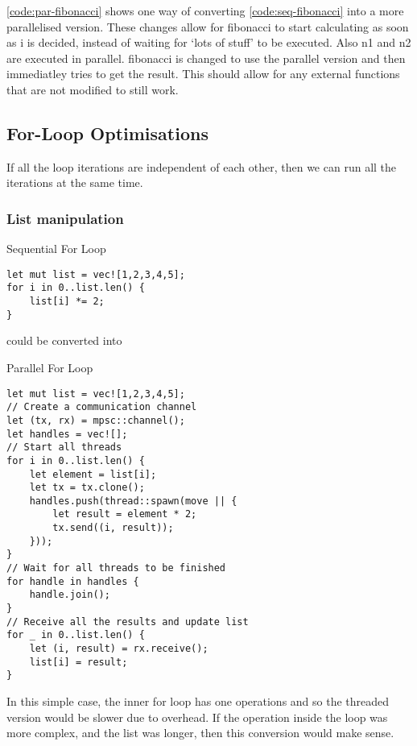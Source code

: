 \documentclass[conference]{IEEEtran}
\begin{document}
\autoref{code:par-fibonacci} shows one way of converting \autoref{code:seq-fibonacci} into a more parallelised version. These changes allow for fibonacci to start calculating as soon as i is decided, instead of waiting for `lots of stuff' to be executed. Also n1 and n2 are executed in parallel. fibonacci is changed to use the parallel version and then immediatley tries to get the result. This should allow for any external functions that are not modified to still work.

\subsection{For-Loop Optimisations}
If all the loop iterations are independent of each other, then we can run all the iterations at the same time.

\subsubsection{List manipulation}

\begin{algorithm}
\caption{Sequential For Loop}
\label{code:seq-for}
\begin{verbatim}
let mut list = vec![1,2,3,4,5];
for i in 0..list.len() {
    list[i] *= 2;
}
\end{verbatim}
\end{algorithm}

could be converted into

\begin{algorithm}
\caption{Parallel For Loop}
\label{code:par-for}
\begin{verbatim}
let mut list = vec![1,2,3,4,5];
// Create a communication channel
let (tx, rx) = mpsc::channel();
let handles = vec![];
// Start all threads
for i in 0..list.len() {
    let element = list[i];
    let tx = tx.clone();
    handles.push(thread::spawn(move || {
        let result = element * 2;
        tx.send((i, result));
    }));
}
// Wait for all threads to be finished
for handle in handles {
    handle.join();
}
// Receive all the results and update list
for _ in 0..list.len() {
    let (i, result) = rx.receive();
    list[i] = result;
}
\end{verbatim}
\end{algorithm}

In this simple case, the inner for loop has one operations and so the threaded version would be slower due to overhead. If the operation inside the loop was more complex, and the list was longer, then this conversion would make sense.
\end{document}
